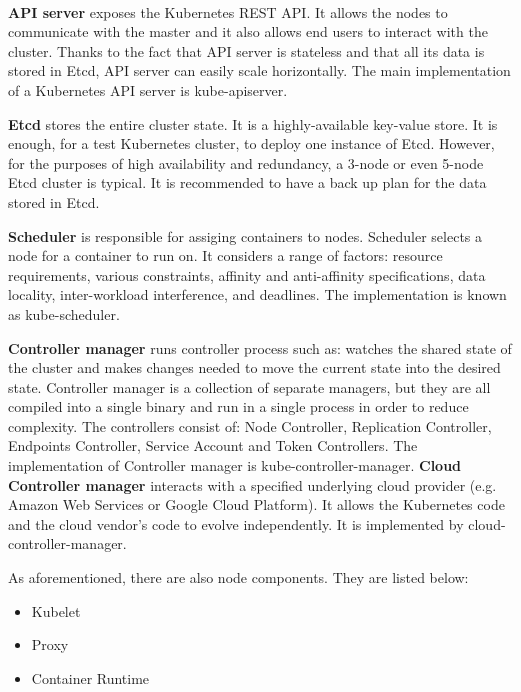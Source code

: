 \documentclass[12pt]{article}
\begin{document}
\paragraph{}
\textbf{API server} exposes the Kubernetes REST API. It allows the nodes to communicate with the master and it also allows end users to interact with the cluster. Thanks to the fact that API server is stateless and that all its data is stored in Etcd, API server can easily scale horizontally. The main implementation of a Kubernetes API server is kube-apiserver\cite{book-mastering-k8s,k8s-cluster,k8s-components}.

\textbf{Etcd} stores the entire cluster state. It is a highly-available key-value store. It is enough, for a test Kubernetes cluster, to deploy one instance of Etcd. However, for the purposes of high availability and redundancy, a 3-node or even 5-node Etcd cluster is typical. It is recommended to have a back up plan for the data stored in Etcd\cite{book-mastering-k8s,k8s-components}.

\textbf{Scheduler} is responsible for assiging containers to nodes. Scheduler selects a node for a container to run on. It considers a range of factors: resource requirements, various constraints, affinity and anti-affinity specifications, data locality, inter-workload interference, and deadlines. The implementation is known as kube-scheduler\cite{book-mastering-k8s,k8s-components}.

\textbf{Controller manager} runs controller process such as: watches the shared state of the cluster and makes changes needed to move the current state into the desired state. Controller manager is a collection of separate managers, but they are all compiled into a single binary and run in a single process in order to reduce complexity. The controllers consist of: Node Controller, Replication Controller, Endpoints Controller, Service Account and Token Controllers. The implementation of Controller manager is kube-controller-manager\cite{book-mastering-k8s,k8s-components}. \textbf{Cloud Controller manager} interacts with a specified underlying cloud provider (e.g. Amazon Web Services or Google Cloud Platform). It allows the Kubernetes code and the cloud vendor’s code to evolve independently. It is implemented by cloud-controller-manager\cite{k8s-components}.

As aforementioned, there are also node components. They are listed below:
\begin{itemize}
\item Kubelet
\item Proxy
\item Container Runtime
\end{itemize}
\end{document}
